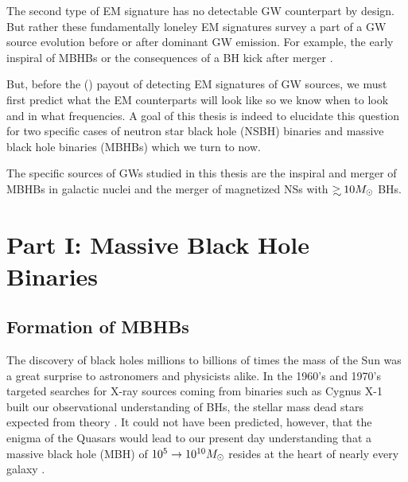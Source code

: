 The second type of EM signature has no detectable GW counterpart by design.
But rather these fundamentally loneley EM signatures survey a part of a GW source evolution before or after dominant GW emission. For example, the early inspiral of MBHBs \citep{Haiman looking for inspiralling MBHBs} or the consequences of a BH kick after merger \citep{BHkicks}.




But, before the () payout of detecting EM signatures of GW sources, we must first predict what the EM counterparts will look like so we know
when to look and in what frequencies. A goal of this thesis is indeed to
elucidate this question for two specific cases of neutron star black hole
(NSBH) binaries and massive black hole binaries (MBHBs) which we turn to now. 

 



The specific sources of GWs studied in this thesis are the inspiral and merger
of MBHBs in galactic nuclei and the merger of magnetized NSs with $\gsim 10
\Msun$ BHs.

\section{Part I: Massive Black Hole Binaries}
\subsection{Formation of MBHBs}
The discovery of black holes millions to billions of times the mass of the Sun was a great surprise to astronomers and physicists alike. In the 1960's and 1970's targeted searches for X-ray sources coming from binaries such as Cygnus X-1 built our observational understanding of BHs, the stellar mass dead stars expected from theory \citep{}. It could not have been predicted, however, that the enigma of the Quasars \citep[\emph{e.g.}][]{LyndenBell:1969} would lead to our present day understanding that a massive black hole (MBH) of $10^5 \rightarrow 10^{10} {M_{\odot}}$ resides at the heart of nearly every galaxy \citep{KR95, KHo2015, FerrareseFord:2005}. 

